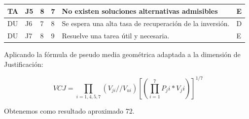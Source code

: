 \documentclass[a4paper,12pt]{article}
\begin{document}
\begin{table}[]
{\begin{tabular}{@{}llllll@{}}
TA  & J5   & 8    & 7     & No existen soluciones alternativas admisibles                                                                                                                                                                                              & E    \\ \midrule
DU  & J6   & 7    & 8     & Se espera una alta tasa de recuperación de la inversión.                                                                                                                                                                                   & D    \\ \midrule
DU  & J7   & 8    & 9     & Resuelve una tarea útil y necesaria.                                                                                                                                                                                                       & E    \\ \bottomrule
\end{tabular}%
}
\end{table}

Aplicando la fórmula de pseudo media geométrica adaptada a la dimensión de Justificación:

$$VCJ = \prod_{i=1,4,5,7} (V_{ji}//V_{ui}) [(\prod_{i=1}^{7} P_ji*V_ji)]^{1/7}$$

Obtenemos como resultado aproximado 72.

\newpage
\end{document}
